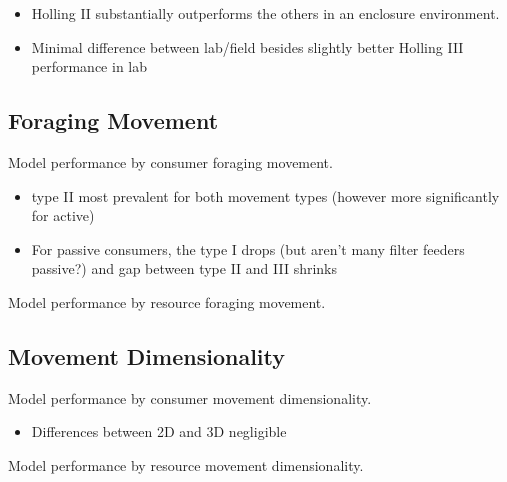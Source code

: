 \documentclass[11pt]{article}
\begin{document}
     \begin{itemize}
      \item Holling II substantially outperforms the others in an enclosure environment.
      \item Minimal difference between lab/field besides slightly better Holling III performance in lab
    \end{itemize}
   
    \subsection{Foraging Movement}
    \begin{table}[ht!]
        \centering
        \caption{Model performance by consumer foraging movement.}
    \end{table}
    
     \begin{itemize}
      \item type II most prevalent for both movement types (however more significantly for active)
      \item For passive consumers, the type I drops (but aren't many filter feeders passive?) and gap between type II and III shrinks
    \end{itemize}
    
    \begin{table}[ht!]
        \centering
        \caption{Model performance by resource foraging movement.}
    \end{table}
    
    \subsection{Movement Dimensionality}
    \begin{table}[ht!]
        \centering
        \caption{Model performance by consumer movement dimensionality.}
    \end{table}
    
     \begin{itemize}
      \item Differences between 2D and 3D negligible 
    \end{itemize}
    
    \begin{table}[ht!]
        \centering
        \caption{Model performance by resource movement dimensionality.}
    \end{table}
    
\end{document}
